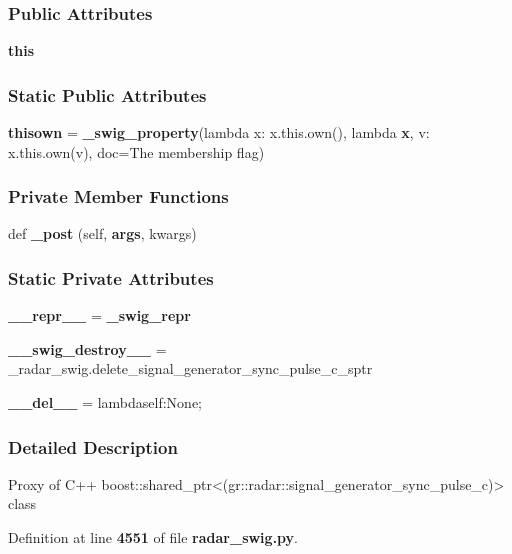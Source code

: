 \subsubsection*{Public Attributes}
\begin{DoxyCompactItemize}
\item 
{\bf this}
\end{DoxyCompactItemize}
\subsubsection*{Static Public Attributes}
\begin{DoxyCompactItemize}
\item 
{\bf thisown} = {\bf \+\_\+swig\+\_\+property}(lambda x\+: x.\+this.\+own(), lambda {\bf x}, v\+: x.\+this.\+own(v), doc=\textquotesingle{}The membership flag\textquotesingle{})
\end{DoxyCompactItemize}
\subsubsection*{Private Member Functions}
\begin{DoxyCompactItemize}
\item 
def {\bf \+\_\+post} (self, {\bf args}, kwargs)
\end{DoxyCompactItemize}
\subsubsection*{Static Private Attributes}
\begin{DoxyCompactItemize}
\item 
{\bf \+\_\+\+\_\+repr\+\_\+\+\_\+} = {\bf \+\_\+swig\+\_\+repr}
\item 
{\bf \+\_\+\+\_\+swig\+\_\+destroy\+\_\+\+\_\+} = \+\_\+radar\+\_\+swig.\+delete\+\_\+signal\+\_\+generator\+\_\+sync\+\_\+pulse\+\_\+c\+\_\+sptr
\item 
{\bf \+\_\+\+\_\+del\+\_\+\+\_\+} = lambdaself\+:\+None;
\end{DoxyCompactItemize}


\subsubsection{Detailed Description}
\begin{DoxyVerb}Proxy of C++ boost::shared_ptr<(gr::radar::signal_generator_sync_pulse_c)> class\end{DoxyVerb}
 

Definition at line {\bf 4551} of file {\bf radar\+\_\+swig.\+py}.



